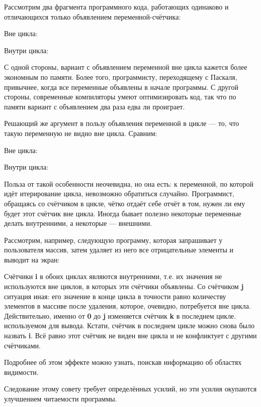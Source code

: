 \begin{notbadadvice}
	\label{NA_hide-your-counters}
	
	Рассмотрим два фрагмента программного кода, работающих одинаково и
	отличающихся только объявлением переменной-счётчика:

	Вне цикла:

	Внутри цикла:

	С одной стороны, вариант с объявлением переменной вне цикла кажется более экономным по памяти.
	Более того, программисту, переходящему с Паскаля, привычнее,
	когда все переменные объявлены в начале программы.
	С другой стороны, современные компиляторы умеют оптимизировать код,
	так что по памяти вариант с объявлением два раза едва ли проиграет.
	
	Решающий же аргумент в пользу объявления переменной в цикле ---
	то, что такую переменную не видно вне цикла.
	Сравним:
	
	Вне цикла:

	Внутри цикла:

	Польза от такой особенности неочевидна, но она есть:
	к переменной, по которой идёт итерирование цикла, невозможно обратиться случайно.
	Программист, обращаясь со счётчиком в цикле, чётко отдаёт себе отчёт в том,
	нужен ли ему будет этот счётчик вне цикла.
	Иногда бывает полезно некоторые переменные делать внутренними, а некоторые --- внешними.
	
	Рассмотрим, например, следующую программу, которая запрашивает у пользователя массив,
	затем удаляет из него все отрицательные элементы и выводит на экран:
	
	Счётчики \textbf{i} в обоих циклах являются внутренними,
	т.е. их значения не используются вне циклов, в которых эти счётчики объявлены.
	Со счётчиком \textbf{j} ситуация иная:
	его значение в конце цикла в точности равно количеству элементов в массиве после удаления,
	которое, очевидно, потребуется вне цикла.
	Действительно, именно от \textbf{0} до \textbf{j} изменяется счётчик \textbf{k}
	в последнем цикле. используемом для вывода.
	Кстати, счётчик в последнем цикле можно снова было назвать \textbf{i}.
	Всё равно этот счётчик не виден вне цикла и не конфликтует с другими счётчиками.
	
	Подробнее об этом эффекте можно узнать, поискав информацию об областях видимости.
	
	Следование этому совету требует определённых усилий, но эти усилия окупаются
	улучшением читаемости программы.

\end{notbadadvice}

